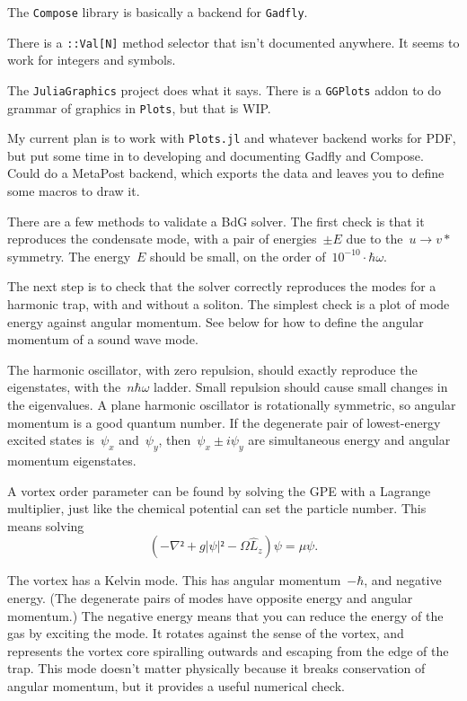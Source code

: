 The {\tt Compose} library is basically a backend for {\tt Gadfly}.

There is a {\tt ::Val[N]} method selector that isn't documented anywhere.  It seems to work for integers and symbols.

The {\tt JuliaGraphics} project does what it says.  There is a {\tt GGPlots} addon to do grammar of graphics in {\tt Plots}, but that is WIP.

My current plan is to work with {\tt Plots.jl} and whatever backend works for PDF, but put some time in to developing and documenting Gadfly and Compose.  Could do a MetaPost backend, which exports the data and leaves you to define some macros to draw it.


There are a few methods to validate a BdG solver.  The first check
is that it reproduces the condensate mode, with a pair of energies~$±E$
due to the~$u→v*$ symmetry.  The energy~$E$ should be small, on the
order of~$10^{-10}·ℏω$.

The next step is to check that the solver correctly reproduces the
modes for a harmonic trap, with and without a soliton.  The simplest
check is a plot of mode energy against angular momentum.  See below for how to define the angular momentum of a sound wave mode.

The harmonic oscillator, with zero repulsion, should exactly reproduce
the eigenstates, with the~$nℏω$ ladder.  Small repulsion should cause small changes
in the eigenvalues.  A plane harmonic oscillator is rotationally symmetric, so angular momentum is a good quantum number.  If the degenerate pair of lowest-energy excited states is~$ψ_x$ and~$ψ_y$, then~$ψ_x±iψ_y$ are simultaneous energy and angular momentum eigenstates.

A vortex order parameter can be found by solving the GPE with a
Lagrange multiplier, just like the chemical potential can set the
particle number.  This means solving
$$(-∇²+g|ψ|²-Ω\hat L_z)ψ=μψ.$$

The vortex has a Kelvin mode.  This has angular momentum~$-ℏ$, and
negative energy.  (The degenerate pairs of modes have opposite
energy and angular momentum.)  The negative energy means that you
can reduce the energy of the gas by exciting the mode.  It rotates
against the sense of the vortex, and represents the vortex core
spiralling outwards and escaping from the edge of the trap.  This
mode doesn't matter physically because it breaks conservation of
angular momentum, but it provides a useful numerical check.

